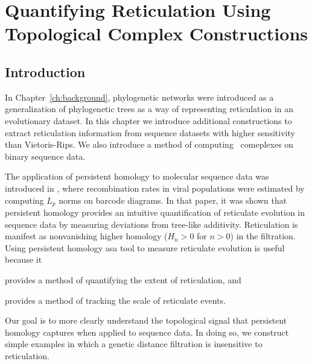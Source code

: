 \chapter{Quantifying Reticulation Using Topological Complex Constructions}
\label{ch:complex_construction}

\section{Introduction}
\label{sec:introduction}

In Chapter~\ref{ch:background}, phylogenetic networks were introduced as a generalization of phylogenetic trees as a way of representing reticulation in an evolutionary dataset.
In this chapter we introduce additional constructions to extract reticulation information from sequence datasets with higher sensitivity than Vietoris-Rips.
We also introduce a method of computing \Cech\ comeplexes on binary sequence data.

The application of persistent homology to molecular sequence data was introduced in \autocite{Chan:2013}, where recombination rates in viral populations were estimated by computing $L_p$ norms on barcode diagrams.
In that paper, it was shown that persistent homology provides an intuitive quantification of reticulate evolution in sequence data by measuring deviations from tree-like additivity.
Reticulation is manifest as nonvanishing higher homology ($H_{n}>0$ for $n>0$) in the filtration.
Using persistent homology asa tool to measure reticulate evolution is useful because it

\begin{inparaenum}[(1)]
\item provides a method of quantifying the extent of reticulation, and
\item provides a method of tracking the scale of reticulate events.
\end{inparaenum}

Our goal is to more clearly understand the topological signal that persistent homology captures when applied to sequence data.
In doing so, we construct simple examples in which a genetic distance filtration is insensitive to reticulation.

